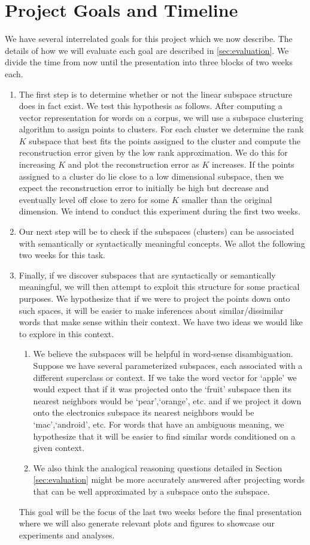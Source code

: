 \section{Project Goals and Timeline}\label{sec:timeline}

We have several interrelated goals for this project which we now describe. 
The details of how we will evaluate each goal are described in \ref{sec:evaluation}.
We divide the time from now until the presentation into three blocks of two weeks each.
 \begin{enumerate}
\item The first step is to determine whether or not the linear subspace structure does in fact exist. 
We test this hypothesis as follows. 
 After computing a vector representation for words on a corpus, we will use a subspace clustering algorithm to assign points to clusters. 
For each cluster we determine the rank $K$ subspace that best fits the points assigned to the cluster and compute the reconstruction error given by the low rank approximation. 
We do this for increasing $K$ and plot the reconstruction error as $K$ increases. 
If the points assigned to a cluster do lie close to a low dimensional subspace, then we expect the reconstruction error to initially be high but decrease and eventually level off close to zero for some $K$ smaller than the original dimension. 
We intend to conduct this experiment during the first two weeks.
 
\item Our next step will be to check if the subspaces (clusters) can be associated with semantically or syntactically meaningful concepts.
We allot the following two weeks for this task. 

\item Finally, if we discover subspaces that are syntactically or semantically meaningful, we will then attempt to exploit this structure for some practical purposes. 
We hypothesize that if we were to project the points down onto such spaces, it will be easier to make inferences about similar/dissimilar words that make sense within their context. We have two ideas we would like to explore in this context. 
	\begin{enumerate}
		\item We believe the subspaces will be helpful in word-sense disambiguation. Suppose we have several parameterized subspaces, each associated with a different superclass or context. 
If we take the word vector for `apple' we would expect that if it was projected onto the `fruit' subspace then its nearest neighbors would be `pear',`orange', etc. and if we project it down onto the electronics subspace its nearest neighbors would be `mac',`android', etc. 
For words that have an ambiguous meaning,  we hypothesize that it will be easier to find similar words conditioned on a given context. 
		\item We also think the analogical reasoning questions detailed in Section \ref{sec:evaluation} might be more accurately answered after projecting words that can be well approximated by a subspace onto the subspace. 
	\end{enumerate} 
	
This goal will be the focus of the last two weeks before the final presentation where we will also generate relevant plots and figures to showcase our experiments and analyses.
\end{enumerate}
